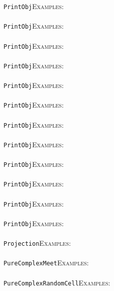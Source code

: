 \documentclass[a4paper,11pt]{report}
\begin{document}
{{ \texttt{PrintObj}{\nobreakspace}{\nobreakspace}{\nobreakspace}{\nobreakspace}\textsc{Examples:} \\
 \\
 \texttt{PrintObj}{\nobreakspace}{\nobreakspace}{\nobreakspace}{\nobreakspace}\textsc{Examples:} \\
 \\
 \texttt{PrintObj}{\nobreakspace}{\nobreakspace}{\nobreakspace}{\nobreakspace}\textsc{Examples:} \\
 \\
 \texttt{PrintObj}{\nobreakspace}{\nobreakspace}{\nobreakspace}{\nobreakspace}\textsc{Examples:} \\
 \\
 \texttt{PrintObj}{\nobreakspace}{\nobreakspace}{\nobreakspace}{\nobreakspace}\textsc{Examples:} \\
 \\
 \texttt{PrintObj}{\nobreakspace}{\nobreakspace}{\nobreakspace}{\nobreakspace}\textsc{Examples:} \\
 \\
 \texttt{PrintObj}{\nobreakspace}{\nobreakspace}{\nobreakspace}{\nobreakspace}\textsc{Examples:} \\
 \\
 \texttt{PrintObj}{\nobreakspace}{\nobreakspace}{\nobreakspace}{\nobreakspace}\textsc{Examples:} \\
 \\
 \texttt{PrintObj}{\nobreakspace}{\nobreakspace}{\nobreakspace}{\nobreakspace}\textsc{Examples:} \\
 \\
 \texttt{PrintObj}{\nobreakspace}{\nobreakspace}{\nobreakspace}{\nobreakspace}\textsc{Examples:} \\
 \\
 \texttt{PrintObj}{\nobreakspace}{\nobreakspace}{\nobreakspace}{\nobreakspace}\textsc{Examples:} \\
 \\
 \texttt{PrintObj}{\nobreakspace}{\nobreakspace}{\nobreakspace}{\nobreakspace}\textsc{Examples:} \\
 \\
 \texttt{Projection}{\nobreakspace}{\nobreakspace}{\nobreakspace}{\nobreakspace}\textsc{Examples:} \\
 \\
 \texttt{PureComplexMeet}{\nobreakspace}{\nobreakspace}{\nobreakspace}{\nobreakspace}\textsc{Examples:} \\
 \\
 \texttt{PureComplexRandomCell}{\nobreakspace}{\nobreakspace}{\nobreakspace}{\nobreakspace}\textsc{Examples:} \\
}}
\end{document}
